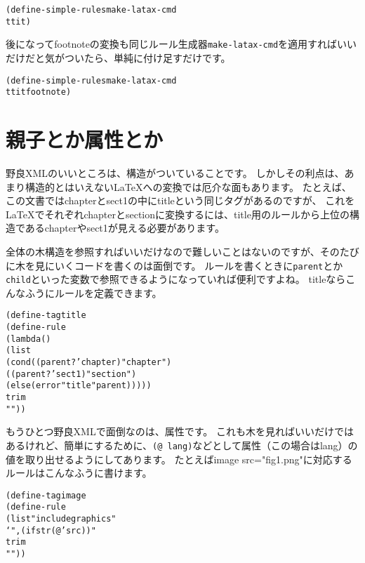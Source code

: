 \documentclass{jsbook}
\begin{document}
\begin{alltt}
(define-simple-rules make-latax-cmd
  tt it)
\end{alltt}
後になって{}footnote{}の変換も同じルール生成器\texttt{make-latax-cmd}を適用すればいいだけだと気がついたら、単純に付け足すだけです。


\begin{alltt}
(define-simple-rules make-latax-cmd
  tt it footnote)
\end{alltt}\section{
親子とか属性とか
}
野良XMLのいいところは、構造がついていることです。
しかしその利点は、あまり構造的とはいえないLaTeXへの変換では厄介な面もあります。
たとえば、この文書では{}chapter{}と{}sect1{}の中に{}title{}という同じタグがあるのですが、
これをLaTeXでそれぞれ{}chapterと{}sectionに変換するには、{}title{}用のルールから上位の構造である{}chapter{}や{}sect1{}が見える必要があります。



全体の木構造を参照すればいいだけなので難しいことはないのですが、そのたびに木を見にいくコードを書くのは面倒です。
ルールを書くときに\texttt{{}parent}とか\texttt{{}child}といった変数で参照できるようになっていれば便利ですよね。
{}title{}ならこんなふうにルールを定義できます。


\begin{alltt}
(define-tag title
  (define-rule
    (lambda ()
      (list
       (cond (({}parent? 'chapter)  "{}{}chapter{}")
	     (({}parent? 'sect1)    "{}{}section{}")
	     (else (error "title" {}parent)))))
    trim
    "{}"))
\end{alltt}
もうひとつ野良XMLで面倒なのは、属性です。
これも木を見ればいいだけではあるけれど、簡単にするために、\texttt{({}@ lang)}などとして属性（この場合はlang）の値を取り出せるようにしてあります。
たとえば{}image src="fig1.png"{}に対応するルールはこんなふうに書けます。


\begin{alltt}
(define-tag image
  (define-rule
    (list "{}{}includegraphics"
          {}`"{},(ifstr ({}@ 'src)){}"
    trim
    ""))
\end{alltt}
\end{document}
